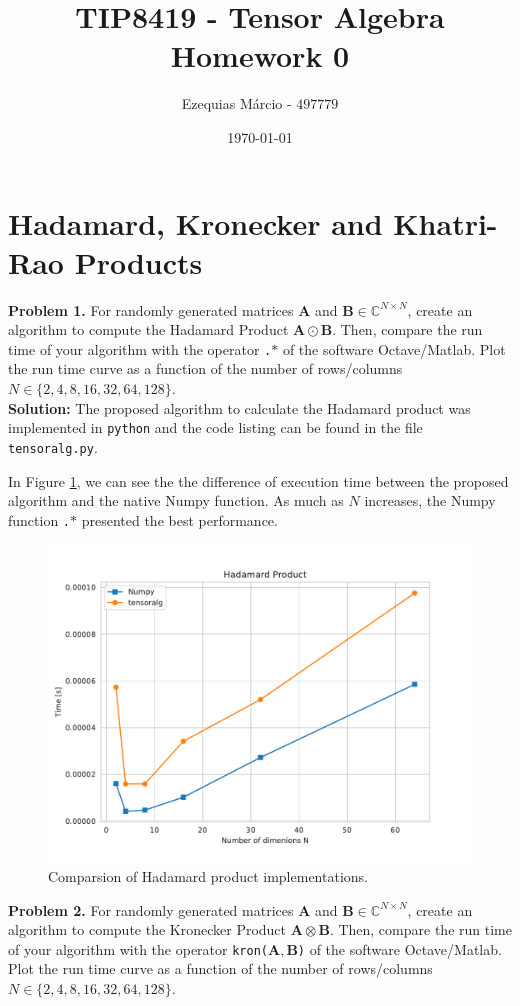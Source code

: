 \documentclass[12pt]{article}
\title{TIP8419 - Tensor Algebra\\ 
       Homework 0}
\author{Ezequias Márcio - $497779$}
\date{\today}
\begin{document}
\maketitle

\section*{Hadamard, Kronecker and Khatri-Rao Products}\vspace{.5cm}

\textbf{Problem 1.} For randomly generated matrices $\bm{A}$ and $\bm{B}\in 
\mathbb{C}^{N\times N}$, create an algorithm to compute the Hadamard Product 
$\bm{A} \odot \bm{B}$. Then, compare the run time of your algorithm with
the operator \texttt{.$\ast$} of the software Octave/Matlab\textregistered. 
Plot the run time curve as a function of the number of rows/columns 
$N \in \{2,4,8,16,32,64,128\}$.\\

\noindent \textbf{Solution:}
The proposed algorithm to calculate the Hadamard product was implemented in 
\texttt{python} and the code listing can be found in the file 
\texttt{tensoralg.py}. 

In Figure \ref{hadm}, we can see the the difference of 
execution time between the proposed algorithm and the native Numpy function. As much as $N$ increases, the Numpy function \texttt{.$\ast$} 
presented the best performance.\\

\begin{figure}[!ht]
    \centering 
    \includegraphics[width=0.55\linewidth]{figs/hadm.pdf}
    \caption{Comparsion of Hadamard product implementations.}
    \label{hadm}
\end{figure}

\noindent
\textbf{Problem 2.} For randomly generated matrices $\bm{A}$ and $\bm{B}\in 
\mathbb{C}^{N\times N}$, create an algorithm to compute the Kronecker Product 
$\bm{A} \otimes \bm{B}$. Then, compare the run time of your algorithm with
the operator \texttt{kron($\bm{A}, \bm{B}$)} of the software 
Octave/Matlab\textregistered. Plot the run time curve as a function of the 
number of rows/columns $N \in \{2,4,8,16,32,64,128\}$.\\
\end{document}
